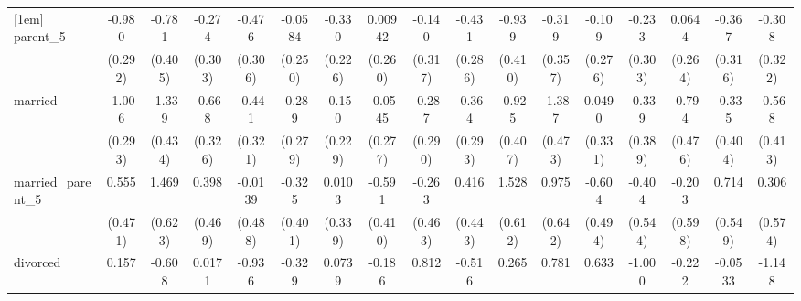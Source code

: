 {\begin{tabular}{l*{16}{c}}
[1em]
parent\_5            &      -0.980\sym{***}&      -0.781         &      -0.274         &      -0.476         &     -0.0584         &      -0.330         &     0.00942         &      -0.140         &      -0.431         &      -0.939\sym{*}  &      -0.319         &      -0.109         &      -0.233         &      0.0644         &      -0.367         &      -0.308         \\
                    &     (0.292)         &     (0.405)         &     (0.303)         &     (0.306)         &     (0.250)         &     (0.226)         &     (0.260)         &     (0.317)         &     (0.286)         &     (0.410)         &     (0.357)         &     (0.276)         &     (0.303)         &     (0.264)         &     (0.316)         &     (0.322)         \\
[1em]
married             &      -1.006\sym{***}&      -1.339\sym{**} &      -0.668\sym{*}  &      -0.441         &      -0.289         &      -0.150         &     -0.0545         &      -0.287         &      -0.364         &      -0.925\sym{*}  &      -1.387\sym{**} &      0.0490         &      -0.339         &      -0.794         &      -0.335         &      -0.568         \\
                    &     (0.293)         &     (0.434)         &     (0.326)         &     (0.321)         &     (0.279)         &     (0.229)         &     (0.277)         &     (0.290)         &     (0.293)         &     (0.407)         &     (0.473)         &     (0.331)         &     (0.389)         &     (0.476)         &     (0.404)         &     (0.413)         \\
[1em]
married\_parent\_5    &       0.555         &       1.469\sym{*}  &       0.398         &     -0.0139         &      -0.325         &      0.0103         &      -0.591         &      -0.263         &       0.416         &       1.528\sym{*}  &       0.975         &      -0.604         &      -0.404         &      -0.203         &       0.714         &       0.306         \\
                    &     (0.471)         &     (0.623)         &     (0.469)         &     (0.488)         &     (0.401)         &     (0.339)         &     (0.410)         &     (0.463)         &     (0.443)         &     (0.612)         &     (0.642)         &     (0.494)         &     (0.544)         &     (0.598)         &     (0.549)         &     (0.574)         \\
[1em]
divorced            &       0.157         &      -0.608         &      0.0171         &      -0.936         &      -0.329         &      0.0739         &      -0.186         &       0.812\sym{*}  &      -0.516         &       0.265         &       0.781         &       0.633         &      -1.000         &      -0.222         &     -0.0533         &      -1.148         \\

\end{tabular}}
